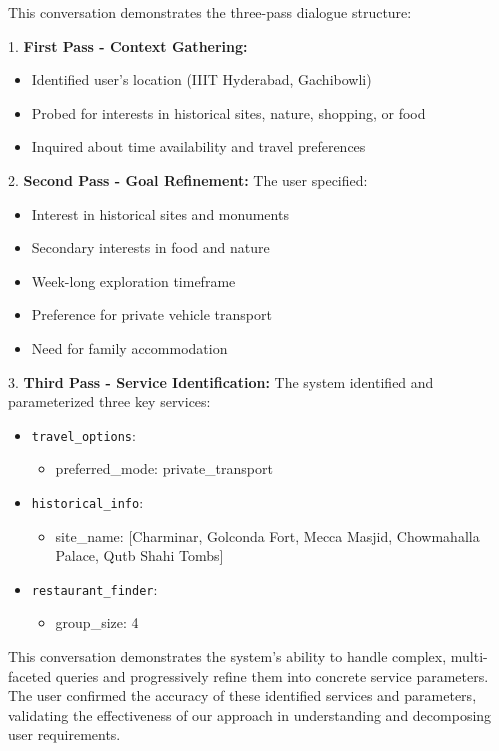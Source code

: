 This conversation demonstrates the three-pass dialogue structure:

1. \textbf{First Pass - Context Gathering:}
   \begin{itemize}
      \item Identified user's location (IIIT Hyderabad, Gachibowli)
      \item Probed for interests in historical sites, nature, shopping, or food
      \item Inquired about time availability and travel preferences
   \end{itemize}

2. \textbf{Second Pass - Goal Refinement:}
   The user specified:
   \begin{itemize}
      \item Interest in historical sites and monuments
      \item Secondary interests in food and nature
      \item Week-long exploration timeframe
      \item Preference for private vehicle transport
      \item Need for family accommodation
   \end{itemize}

3. \textbf{Third Pass - Service Identification:}
   The system identified and parameterized three key services:
   \begin{itemize}
      \item \texttt{travel\_options}: 
         \begin{itemize}
            \item preferred\_mode: private\_transport
         \end{itemize}
      \item \texttt{historical\_info}:
         \begin{itemize}
            \item site\_name: [Charminar, Golconda Fort, Mecca Masjid, Chowmahalla Palace, Qutb Shahi Tombs]
         \end{itemize}
      \item \texttt{restaurant\_finder}:
         \begin{itemize}
            \item group\_size: 4
         \end{itemize}
   \end{itemize}

This conversation demonstrates the system's ability to handle complex, multi-faceted queries and progressively refine them into concrete service parameters. The user confirmed the accuracy of these identified services and parameters, validating the effectiveness of our approach in understanding and decomposing user requirements.
